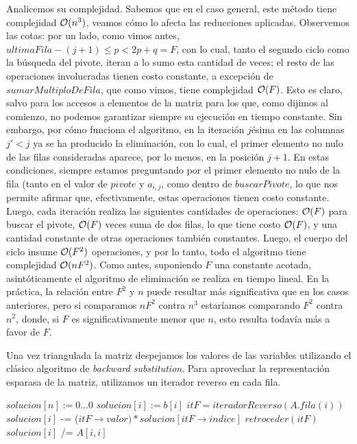  Analicemos su complejidad. Sabemos que en el caso general, este método tiene complejidad $\mathcal{O}(n^3)$, veamos cómo lo afecta las reducciones aplicadas. Observemos las cotas: por un lado, como vimos antes, $ultimaFila - (j+1) \leq p < 2p+q = F$, con lo cual, tanto el segundo ciclo como la búsqueda del pivote, iteran a lo sumo esta cantidad de veces; el resto de las operaciones involucradas tienen costo constante, a excepción de $sumarMultiploDeFila$, que como vimos, tiene complejidad $\mathcal{O}(F)$. Esto es claro, salvo para los accesos a elementos de la matriz para los que, como dijimos al comienzo, no podemos garantizar siempre su ejecución en tiempo constante. Sin embargo, por cómo funciona el algoritmo, en la iteración $j$ésima en las columnas $j' <j$ ya se ha producido la eliminación, con lo cual, el primer elemento no nulo de las filas consideradas aparece, por lo menos, en la posición $j+1$. En estas condiciones, siempre estamos preguntando por el primer elemento no nulo de la fila (tanto en el valor de 
$pivote$ y $a_{i,j}$, como dentro de $buscarPivote$, lo que nos permite afirmar que, efectivamente, estas operaciones tienen costo constante. Luego, cada iteración realiza las siguientes cantidades de operaciones: $\mathcal{O}(F)$ para buscar el pivote, $\mathcal{O}(F)$ veces suma de dos filas, lo que tiene costo $\mathcal{O}(F)$, y una cantidad constante de otras operaciones también constantes. Luego, el cuerpo del ciclo insume $\mathcal{O}(F^2)$ operaciones, y por lo tanto, todo el algoritmo tiene complejidad $\mathcal{O}(nF^2)$. Como antes, suponiendo $F$ una constante acotada, asintóticamente el algoritmo de eliminación se realiza en tiempo lineal.  En la práctica, la relación entre $F^2$ y $n$ puede resultar más significativa que en los casos anteriores, pero si comparamos $nF^2$ contra $n^3$ estaríamos comparando $F^2$ contra $n^2$, donde, si $F$ es significativamente menor que $n$, esto resulta todavía más a favor de $F$.
 
 Una vez triangulada la matriz despejamos los valores de las variables utilizando el clásico algoritmo de \emph{backward substitution}. Para aprovechar la representación esparasa de la matriz, utilizamos un iterador reverso en cada fila.
 
 \begin{algorithm}[!h]
\caption{$despejar(A, b)$}
\begin{algorithmic}
\State $solucion[n] := 0 \dots 0$
	\State $solucion[i] := b[i]$
	\State $itF = iteradorReverso(A.fila(i))$
	        \State $solucion[i]$ -= ($itF \rightarrow valor) * solucion[itF \rightarrow indice]$
	        \State $retroceder(itF)$
      \EndWhile
      		\State $solucion[i]$ /= $A[i,i]$
\EndFor
\end{algorithmic}
\end{algorithm} 
 
